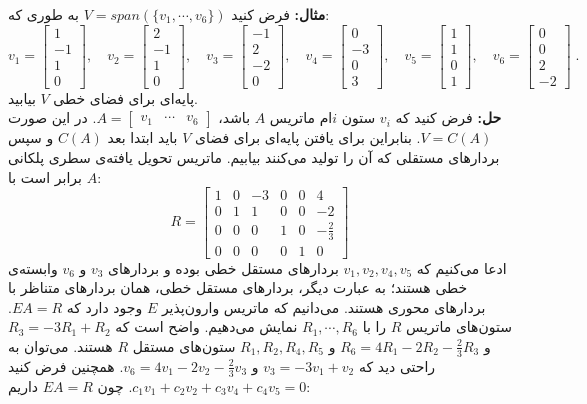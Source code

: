 \textbf{مثال:}
فرض کنید $V = span(\{v_1,\cdots,v_6\})$ به طوری که:
$$v_1=\begin{bmatrix}
1\\-1\\1\\0
\end{bmatrix},\quad v_2=\begin{bmatrix}
2\\-1\\1\\0
\end{bmatrix},\quad v_3= \begin{bmatrix}
-1\\2\\-2\\0
\end{bmatrix},\quad v_4=\begin{bmatrix}
0\\-3\\0\\3
\end{bmatrix},\quad v_5= \begin{bmatrix}
1\\1\\0\\1
\end{bmatrix},\quad v_6 = \begin{bmatrix}
0\\0\\2\\-2
\end{bmatrix} \; .$$
پایه‌ای برای فضا‌ی خطی $V$ بیابید.\\
\textbf{حل:}
فرض کنید که $v_i$ ستون $i$ام ماتریس $A$ باشد، $A=\begin{bmatrix}
v_1&\cdots&v_6
\end{bmatrix}$. در این صورت $V=C(A)$. بنابراین برای یافتن پایه‌ای برای فضا‌ی $V$ باید ابتدا بعد $C(A)$ و سپس بردار‌های مستقلی که آن را تولید می‌کنند بیابیم.
ماتریس تحویل یافته‌ی سطری پلکانی $A$ برابر است با:
$$R = \begin{bmatrix}
1&0&-3&0&0&4\\
0&1&1&0&0&-2\\
0&0&0&1&0&-\frac{2}{3}\\
0&0&0&0&1&0
\end{bmatrix}$$
ادعا می‌کنیم که $v_1,v_2,v_4,v_5$ بردار‌های مستقل‌ خطی بوده و بردار‌های $v_3$ و $v_6$ وابسته‌ی خطی هستند؛ به عبارت دیگر، بردارهای مستقل خطی، همان بردارهای متناظر با بردارهای محوری هستند. می‌دانیم که ماتریس وارون‌پذیر $E$ وجود دارد که $EA=R$. ستون‌های ماتریس $R$ را با $R_1,\cdots,R_6$ نمایش می‌دهیم. واضح است که $R_3 = -3R_1+R_2$ و $R_6=4R_1-2R_2-\frac{2}{3}R_3$ و $R_1,R_2,R_4,R_5$ ستون‌های مستقل $R$ هستند. می‌توان به راحتی دید که $v_3=-3v_1+v_2$ و $v_6=4v_1-2v_2-\frac{2}{3}v_3$. همچنین فرض کنید $c_1v_1+c_2v_2+c_3v_4+c_4v_5=0$. چون $EA=R$ داریم:
